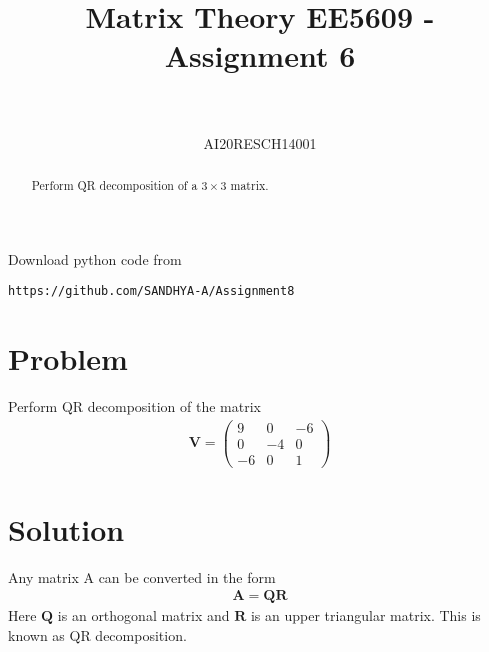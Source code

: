 \documentclass[journal,12pt,twocolumn]{IEEEtran}
\let\vec\mathbf
\numberwithin{equation}{subsection}
\newcommand{\myvec}[1]{\ensuremath{\begin{pmatrix}#1\end{pmatrix}}}
\begin{document}
\title{Matrix Theory EE5609 - Assignment 6\\
}

\author{\\
 \\
AI20RESCH14001\\
 }

\maketitle
\begin{abstract}
Perform QR decomposition of a $3 \times 3$ matrix.
\end{abstract}
Download  python code from 
\begin{lstlisting}
https://github.com/SANDHYA-A/Assignment8
\end{lstlisting}
\section{Problem}
Perform QR decomposition of the matrix
\begin{align}
   \vec{V} = \myvec{9&0&-6\\0&-4&0\\-6&0&1}  \label{1.1}
\end{align}
\section{Solution}
Any matrix A can be converted in the form 
\begin{align}
    \vec{A} = \vec{Q}\vec{R}\label{2.1}
\end{align}
Here  $\vec{Q}$ is an orthogonal matrix and $\vec{R}$ is an upper triangular matrix. This is known as QR decomposition.
\end{document}
